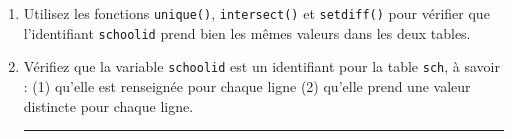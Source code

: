 \documentclass[12pt,twosided, notitlepage]{book}
\newenvironment{Shaded}{}{}
\newcommand{\CommentTok}[1]{\textcolor[rgb]{0.00,0.50,0.00}{#1}}
\newcommand{\KeywordTok}[1]{\textcolor[rgb]{0.00,0.00,1.00}{#1}}
\newcommand{\NormalTok}[1]{#1}
\newcommand{\OperatorTok}[1]{#1}
\newif \ifsol
\renewenvironment{Shaded}{\begin{snugshade}}{\end{snugshade}}
\begin{document}
\begin{enumerate}
  \begin{enumerate}
  \def\labelenumii{\roman{enumii}.}
  \item
    Utilisez les fonctions \texttt{unique()},
    \texttt{intersect()} et
    \texttt{setdiff()} pour vérifier que
    l'identifiant \texttt{schoolid} prend bien les mêmes valeurs dans
    les deux tables.

    \ifsol 

    \begin{center} \rule{0.5\linewidth}{\linethickness}\end{center}

\begin{Shaded}
\begin{Highlighting}[]
\KeywordTok{length}\NormalTok{(}\KeywordTok{intersect}\NormalTok{(stu}\OperatorTok{$}\NormalTok{schoolid, sch}\OperatorTok{$}\NormalTok{schoolid))}
\NormalTok{  ## [1] 226}
\KeywordTok{length}\NormalTok{(}\KeywordTok{unique}\NormalTok{(stu}\OperatorTok{$}\NormalTok{schoolid))}
\NormalTok{  ## [1] 226}
\KeywordTok{length}\NormalTok{(}\KeywordTok{unique}\NormalTok{(sch}\OperatorTok{$}\NormalTok{schoolid))}
\NormalTok{  ## [1] 226}

\CommentTok{# Cela fonctionne aussi plus finement avec setdiff()}
\KeywordTok{setdiff}\NormalTok{(stu}\OperatorTok{$}\NormalTok{schoolid, sch}\OperatorTok{$}\NormalTok{schoolid)}
\NormalTok{  ## character(0)}
\CommentTok{# Aucune valeur de stu$schoolid n'est pas dans sch$schoolid}
\KeywordTok{setdiff}\NormalTok{(sch}\OperatorTok{$}\NormalTok{schoolid, stu}\OperatorTok{$}\NormalTok{schoolid)}
\NormalTok{  ## character(0)}
\CommentTok{# Aucune valeur de sch$schoolid n'est pas dans stu$schoolid}
\end{Highlighting}
\end{Shaded}

    \begin{center} \rule{0.5\linewidth}{\linethickness}\end{center} 
      \bigskip 
      \fi
  \item
    Vérifiez que la variable \texttt{schoolid} est un identifiant pour
    la table \texttt{sch}, à savoir : (1) qu'elle est renseignée pour
    chaque ligne (2) qu'elle prend une valeur distincte pour chaque
    ligne.

    \ifsol 
     \begin{center} \rule{0.5\linewidth}{\linethickness}\end{center}


\end{enumerate}
\end{enumerate}
\end{document}
